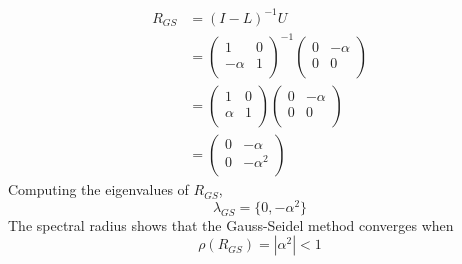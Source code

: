 \documentclass[11pt]{article} %
\begin{document}
\begin{equation}
\begin{split}
R_{GS}& =(I-L) ^{-1} U \\
&= \left ( \begin{array}{rr}
1 &0 \\
-\alpha & 1 \\
\end{array} \right )^{-1}
\left ( \begin{array}{rr}
0 & -\alpha \\
0 & 0 \\
\end{array} \right )\\
&= \left ( \begin{array}{rr}
1 &0 \\
\alpha & 1 \\
\end{array} \right )
\left ( \begin{array}{rr}
0 & -\alpha \\
0 & 0 \\
\end{array} \right )\\
&=\left ( \begin{array}{rr}
0 & -\alpha \\
0 & -\alpha^2 \\
\end{array} \right )
\end{split}
\end{equation}
Computing the eigenvalues of $R_{GS}$,
\begin{equation}
\lambda_{GS} = \{ 0, -\alpha^2 \}
\end{equation}
The spectral radius shows that the Gauss-Seidel method converges when
\begin{equation}
\boxed{\rho(R_{GS}) =| \alpha^2| < 1}
\end{equation}
\end{document}

